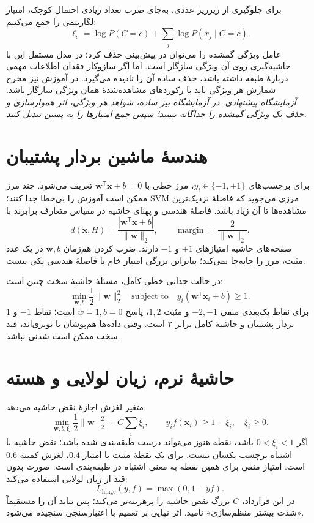 برای جلوگیری از زیرریز عددی، به‌جای ضرب تعداد زیادی احتمال کوچک، امتیاز لگاریتمی را جمع می‌کنیم:
\[\ell_c=\log P(C=c)+\sum_j\log P(x_j\mid C=c).\]
عامل ویژگی گمشده را می‌توان در پیش‌بینی حذف کرد؛ در مدل مستقل این با حاشیه‌گیری روی آن ویژگی سازگار است. اما اگر سازوکار فقدان اطلاعات مهمی دربارهٔ طبقه داشته باشد، حذف ساده آن را نادیده می‌گیرد. در آموزش نیز مخرج شمارش هر ویژگی باید با رکوردهای مشاهده‌شدهٔ همان ویژگی سازگار باشد.
\textit{آزمایشگاه پیشنهادی. در آزمایشگاه بیز ساده، شواهد هر ویژگی، اثر هموارسازی و حذف یک ویژگی گمشده را جداگانه ببینید؛ سپس جمع امتیازها را به پسین تبدیل کنید.}\par 

\section{هندسهٔ ماشین بردار پشتیبان}
برای برچسب‌های $y_i\in\{-1,+1\}$، مرز خطی با $\mathbf w^\mathsf T\mathbf x+b=0$ تعریف می‌شود. چند مرز ممکن است آموزش را بی‌خطا جدا کنند؛ SVM مرزی می‌جوید که فاصلهٔ نزدیک‌ترین مشاهده‌ها تا آن زیاد باشد. فاصلهٔ هندسی و پهنای حاشیه در مقیاس متعارف برابرند با
\[d(\mathbf x,H)=\frac{|\mathbf w^\mathsf T\mathbf x+b|}{\|\mathbf w\|_2},\qquad \operatorname{margin}=\frac2{\|\mathbf w\|_2}.\]
صفحه‌های حاشیه امتیازهای $+1$ و $-1$ دارند. ضرب کردن هم‌زمان $\mathbf w,b$ در یک عدد مثبت، مرز را جابه‌جا نمی‌کند؛ بنابراین بزرگی امتیاز خام با فاصلهٔ هندسی یکی نیست.

در حالت جدایی خطی کامل، مسئلهٔ حاشیهٔ سخت چنین است:
\[\min_{\mathbf w,b}\frac12\|\mathbf w\|_2^2\quad\text{subject to}\quad y_i(\mathbf w^\mathsf T\mathbf x_i+b)\ge1.\]
برای نقاط یک‌بعدی منفی $-2,-1$ و مثبت $1,2$، پاسخ $w=1,b=0$ است؛ نقاط $-1$ و $1$ بردار پشتیبان و حاشیهٔ کامل برابر ۲ است. وقتی داده‌ها هم‌پوشان یا نویزی‌اند، قید سخت ممکن است شدنی نباشد.

\section{حاشیهٔ نرم، زیان لولایی و هسته}
متغیر لغزش اجازهٔ نقض حاشیه می‌دهد:
\[\min_{\mathbf w,b,\boldsymbol\xi}\frac12\|\mathbf w\|_2^2+C\sum_i\xi_i,\qquad y_if(\mathbf x_i)\ge1-\xi_i,\quad\xi_i\ge0.\]
اگر $0<\xi_i<1$ باشد، نقطه هنوز می‌تواند درست طبقه‌بندی شده باشد؛ نقض حاشیه با اشتباه برچسب یکسان نیست. برای یک نقطهٔ مثبت با امتیاز $0.4$، لغزش کمینه $0.6$ است. امتیاز منفی برای همین نقطه به معنی اشتباه در طبقه‌بندی است. صورت بدون قید از زیان لولایی استفاده می‌کند:
\[L_{\mathrm{hinge}}(y,f)=\max(0,1-yf).\]
در این قرارداد، $C$ بزرگ نقض حاشیه را پرهزینه‌تر می‌کند؛ پس نباید آن را مستقیماً «شدت بیشتر منظم‌سازی» نامید. اثر نهایی بر تعمیم با اعتبارسنجی سنجیده می‌شود.

